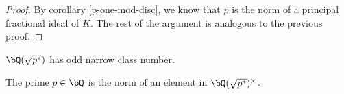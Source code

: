 \begin{proof}
    By corollary \ref{p-one-mod-disc}, we know that $p$ is the norm of a principal fractional ideal of $K$. The rest of the argument is analogous to the previous proof.
\end{proof}


\begin{prop}
$\bQ(\sqrt{p^*})$ has odd narrow class number.
\end{prop}    

\begin{cor}\label{p-norm}
The prime $p \in \bQ$ is the norm of an element in $\bQ(\sqrt{p^*})^{\times}$.
\end{cor}
